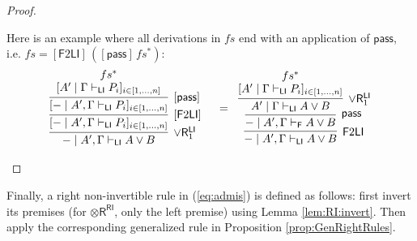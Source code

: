 \documentclass[submission,copyright,creativecommons]{eptcs}
\theoremstyle{definition}
\newcommand{\tr}{\otimes \mathsf{R}}
\newcommand{\pass}{\mathsf{pass}}
\newcommand{\orrone}{\lor \mathsf{R}_{1}}
\newcommand{\RI}{\mathsf{RI}}
\newcommand{\LI}{\mathsf{LI}}
\newcommand{\F}{\mathsf{F}}
\newcommand{\proofbox}[1]{\begin{tabular}{l} #1 \end{tabular}}
\begin{document}
\begin{proof}
\begin{itemize}
      Here is an example where all derivations in $fs$ end with an application of $\pass$, i.e. $fs = [\F 2 \LI] \,([\pass]\,fs^*)$:
      \begin{displaymath}
        \begin{array}{cc}
          \proofbox{
            \infer[\orrone^{\LI}]{- \mid A' , \Gamma \vdash_{\LI} A \lor B}{
              \infer[ {[\F 2 \LI]} ]{[- \mid A' , \Gamma \vdash_{\LI} P_i]_{i \in [1 , \dots , n]}}{
                \infer[ {[\pass]} ]{[- \mid A' , \Gamma \vdash_{\LI} P_i]_{i \in [1 , \dots , n]}}{
                  \deduce{[A' \mid \Gamma \vdash_{\LI} P_i]_{i \in [1 , \dots , n]}}{fs^{*}}
                }
              }
            }
          }
          &
          =
          \proofbox{
            \infer[\F 2 \LI]{- \mid A' , \Gamma \vdash_{\LI} A \lor B}{
              \infer[\pass]{- \mid A' , \Gamma \vdash_{\F} A \lor B}{
                \infer[\orrone^{\LI}]{A' \mid \Gamma \vdash_{\LI} A \lor B}{
                  \deduce{[A' \mid \Gamma \vdash_{\LI} P_i]_{i \in [1 , \dots , n]}}{fs^{*}}
                }
              }
            }
          }
        \end{array}
      \end{displaymath}
    \end{itemize}
\end{proof}
Finally, a right non-invertible rule in (\ref{eq:admis}) is defined as follows: first invert its premises (for $\tr^{\RI}$, only the left premise) using Lemma \ref{lem:RI:invert}. Then apply the corresponding generalized rule in Proposition \ref{prop:GenRightRules}.
\end{document}
